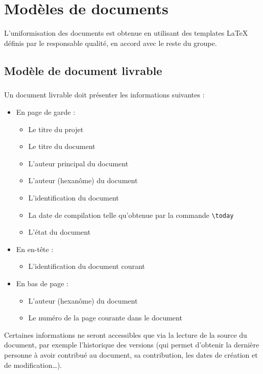 

\renewcommand\docname{ANNEXESv1.1}
\appendix

\chapter{Modèles de documents}

\label{chapter:modeles_documents}

L'uniformisation des documents est obtenue en utilisant des templates \LaTeX{} définis par le responsable qualité, en accord avec le reste du groupe.

\section{Modèle de document livrable}

\paragraph{}
Un document livrable doit présenter les informations suivantes :
\begin{itemize}
\item En page de garde :
\begin{itemize}
\item Le titre du projet
\item Le titre du document
\item L'auteur principal du document
\item L'auteur (hexanôme) du document
\item L'identification du document
\item La date de compilation telle qu'obtenue par la commande \verb|\today|
\item L'état du document
\end{itemize}
\item En en-tête :
\begin{itemize}
\item L'identification du document courant
\end{itemize}
\item En bas de page :
\begin{itemize}
\item L'auteur (hexanôme) du document
\item Le numéro de la page courante dans le document
\end{itemize}
\end{itemize}
Certaines informations ne seront accessibles que via la lecture de la source du document, par exemple l'historique des versions (qui permet d'obtenir la dernière personne à avoir contribué au document, sa contribution, les dates de création et de modification\ldots).

